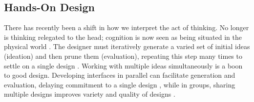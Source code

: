 %
%

\subsection{Hands-On Design}
There has recently been a shift in how we interpret the act of thinking.
No longer is thinking relegated to the head; cognition is now seen as being situated in the physical world \cite{Hutchins1995}.
The designer must iteratively generate a varied set of initial ideas  (ideation) and then prune them (evaluation), repeating this step many times to settle on a single design \cite{Buxton2007}.
Working with multiple ideas simultaneously is a boon to good design.
Developing interfaces in parallel can facilitate generation and evaluation, delaying commitment to a single design \cite{Hartmann2008, Resnick2008}, while
in groups, sharing multiple designs improves variety and quality of designs \cite{Dow2011}.


